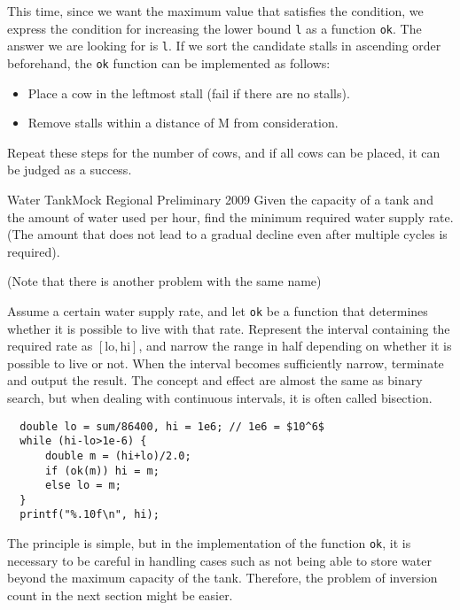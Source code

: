 This time, since we want the maximum value that satisfies the condition, we express the condition for increasing the lower bound \texttt{l} as a function \texttt{ok}. The answer we are looking for is \texttt{l}.
If we sort the candidate stalls in ascending order beforehand, the \texttt{ok} function can be implemented as follows:
\begin{itemize}
    \item Place a cow in the leftmost stall (fail if there are no stalls).
    \item Remove stalls within a distance of M from consideration.
\end{itemize}
Repeat these steps for the number of cows, and if all cows can be placed, it can be judged as a success.

\begin{psbox}{Water Tank}{Mock Regional Preliminary 2009}
Given the capacity of a tank and the amount of water used per hour, find the minimum required water supply rate. (The amount that does not lead to a gradual decline even after multiple cycles is required).

(Note that there is another problem with the same name)

\end{psbox}

Assume a certain water supply rate, and let \texttt{ok} be a function that determines whether it is possible to live with that rate. Represent the interval containing the required rate as $[\text{lo},\text{hi}]$, and narrow the range in half depending on whether it is possible to live or not. When the interval becomes sufficiently narrow, terminate and output the result. The concept and effect are almost the same as binary search, but when dealing with continuous intervals, it is often called bisection.

\begin{cbox}
\begin{verbatim}
  double lo = sum/86400, hi = 1e6; // 1e6 = $10^6$
  while (hi-lo>1e-6) {
      double m = (hi+lo)/2.0;
      if (ok(m)) hi = m;
      else lo = m;
  }
  printf("%.10f\n", hi);
\end{verbatim}
\end{cbox}

The principle is simple, but in the implementation of the function \texttt{ok}, it is necessary to be careful in handling cases such as not being able to store water beyond the maximum capacity of the tank. Therefore, the problem of inversion count in the next section might be easier.
